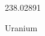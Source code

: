 \documentclass[12pt]{article}
\begin{document}
\hfill{}
\vfill
\begin{center}
  {\fontsize{50}{60}
  }

  238.02891

Uranium
\end{center}
\vfill
\end{document}
